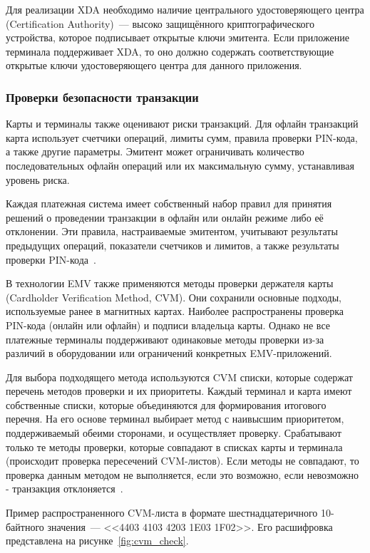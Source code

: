 Для реализации XDA необходимо наличие центрального удостоверяющего центра (Certification Authority)~--- высоко защищённого криптографического устройства, которое подписывает открытые ключи эмитента.
Если приложение терминала поддерживает XDA, то оно должно содержать соответствующие открытые ключи удостоверяющего центра для данного приложения.

\subsubsection{Проверки безопасности транзакции}
\label{subsubsec:transaction_security_check}

Карты и терминалы также оценивают риски транзакций.
Для офлайн транзакций карта использует счетчики операций, лимиты сумм, правила проверки PIN-кода, а также другие параметры.
Эмитент может ограничивать количество последовательных офлайн операций или их максимальную сумму, устанавливая уровень риска.

Каждая платежная система имеет собственный набор правил для принятия решений о проведении транзакции в офлайн или онлайн режиме либо её отклонении.
Эти правила, настраиваемые эмитентом, учитывают результаты предыдущих операций, показатели счетчиков и лимитов, а также результаты проверки PIN-кода~\cite{secure_nfc_mc}.


В технологии EMV также применяются методы проверки держателя карты (Cardholder Verification Method, CVM).
Они сохранили основные подходы, используемые ранее в магнитных картах.
Наиболее распространены проверка PIN-кода (онлайн или офлайн) и подписи владельца карты.
Однако не все платежные терминалы поддерживают одинаковые методы проверки из-за различий в оборудовании или ограничений конкретных EMV-приложений.

Для выбора подходящего метода используются CVM списки, которые содержат перечень методов проверки и их приоритеты.
Каждый терминал и карта имеют собственные списки, которые объединяются для формирования итогового перечня.
На его основе терминал выбирает метод с наивысшим приоритетом, поддерживаемый обеими сторонами, и осуществляет проверку.
Срабатывают только те методы проверки, которые совпадают в списках карты и терминала (происходит проверка пересечений CVM-листов).
Если методы не совпадают, то проверка данным методом не выполняется, если это возможно, если невозможно - транзакция отклоняется~\cite{emv_card_mechanism, emv_book_3}.

Пример распространенного CVM-листа в формате шестнадцатеричного 10-байтного значения~--- <<4403 4103 4203 1E03 1F02>>.
Его расшифровка представлена на рисунке~\ref{fig:cvm_check}.

